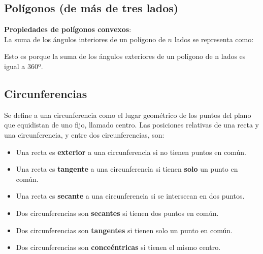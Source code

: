 \documentclass[10pt]{article}
\begin{document}
\subsection{Polígonos (de más de tres lados)}
\textbf{Propiedades de polígonos convexos}:\\
La suma de los ángulos interiores de un polígono de $n$ lados se representa como:
\begin{center}
\end{center}
Esto es porque la suma de los ángulos exteriores de un polígono de n lados es igual a 360º.
\subsection{Circunferencias}
Se define a una circunferencia como el lugar geométrico de los puntos del plano que equidistan de uno fijo, llamado centro. Las posiciones relativas de una recta y una circunferencia, y entre dos circunferencias, son:
\begin{itemize}
\item Una recta es \textbf{exterior} a una circunferencia si no tienen puntos en común.
\item Una recta es \textbf{tangente} a una circunferencia si tienen \textbf{solo} un punto en común.
\item Una recta es \textbf{secante} a una circunferencia si se intersecan en dos puntos.
\item Dos circunferencias son \textbf{secantes} si tienen dos puntos en común.
\item Dos circunferencias son \textbf{tangentes} si tienen solo un punto en común.
\item Dos circunferencias son \textbf{conceéntricas} si tienen el mismo centro.
\end{itemize}
\newpage
\end{document}
